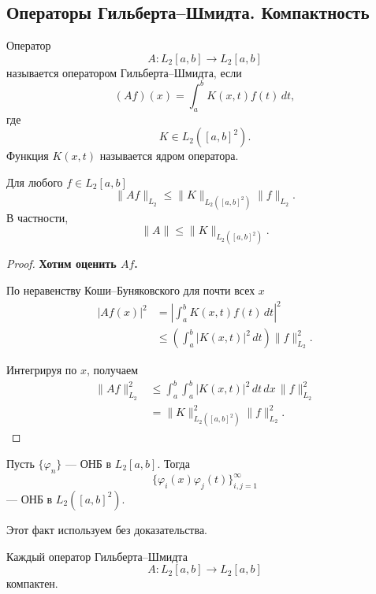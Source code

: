 \subsection{Операторы Гильберта--Шмидта. Компактность}

\begin{definition}
	Оператор
	\[
	A:L_2[a,b]\to L_2[a,b]
	\]
	называется оператором Гильберта--Шмидта, если
	\[
	(Af)(x)
	=
	\int_a^b K(x,t)f(t)\,dt,
	\]
	где
	\[
	K\in L_2([a,b]^2).
	\]
	Функция \(K(x,t)\) называется ядром оператора.
\end{definition}

\begin{remark}
	Для любого \(f\in L_2[a,b]\)
	\[
	\|Af\|_{L_2}
	\leq
	\|K\|_{L_2([a,b]^2)}\|f\|_{L_2}.
	\]
	В частности,
	\[
	\|A\|
	\leq
	\|K\|_{L_2([a,b]^2)}.
	\]
\end{remark}

\begin{proof}
	\textbf{Хотим оценить \(Af\).}
	
	По неравенству Коши--Буняковского для почти всех \(x\)
	\[
	\begin{aligned}
		|Af(x)|^2
		&=
		\left|
		\int_a^b K(x,t)f(t)\,dt
		\right|^2
		\\
		&\leq
		\left(
		\int_a^b|K(x,t)|^2\,dt
		\right)
		\|f\|_{L_2}^2.
	\end{aligned}
	\]
	
	Интегрируя по \(x\), получаем
	\[
	\begin{aligned}
		\|Af\|_{L_2}^2
		&\leq
		\int_a^b\int_a^b
		|K(x,t)|^2\,dt\,dx\,
		\|f\|_{L_2}^2
		\\
		&=
		\|K\|_{L_2([a,b]^2)}^2
		\|f\|_{L_2}^2.
	\end{aligned}
	\]
\end{proof}

\begin{theorem}
	Пусть \(\{\varphi_n\}\) --- ОНБ в \(L_2[a,b]\).
	Тогда
	\[
	\{\varphi_i(x)\varphi_j(t)\}_{i,j=1}^{\infty}
	\]
	--- ОНБ в \(L_2([a,b]^2)\).
\end{theorem}

\begin{remark}
	Этот факт используем без доказательства.
\end{remark}

\begin{theorem}
	Каждый оператор Гильберта--Шмидта
	\[
	A:L_2[a,b]\to L_2[a,b]
	\]
	компактен.
\end{theorem}

